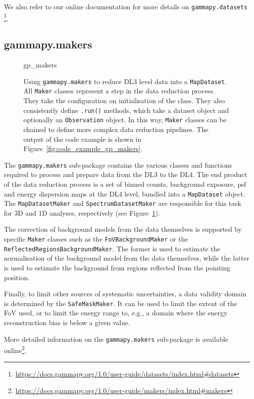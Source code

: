 \documentclass[longauth]{aa}
\newcommand{\code}[1]{\texttt{#1}}
\begin{document}
We also refer to our online documentation for more details on \code{gammapy.datasets}
\footnote{\url{https://docs.gammapy.org/1.0/user-guide/datasets/index.html\#datasets}}.

\subsection{gammapy.makers}
\label{ssec:gammapy-makers}
%
\begin{figure}
	\small
    {gp_makers}
	\caption{
        Using \code{gammapy.makers} to reduce DL3 level data into a
		\code{MapDataset}. All \code{Maker} classes represent 
		a step in the data reduction process. They take
        the configuration on initialisation of the class. They 
		also consistently define \code{.run()} methods, which take
		a dataset object and optionally an \code{Observation} 
		object. In this way, \code{Maker} classes can be chained
		to define more complex data reduction pipelines. The output
		of the code example is shown in Figure~\ref{fig:code_example_gp_makers}.
    }
	\label{fig*:minted:gp_makers}
\end{figure}
%
The \code{gammapy.makers} sub-package contains the various classes and functions required
to process and prepare \gammaray data from the DL3 to the DL4.
The end product of the data reduction process is a set of binned counts,
background exposure, psf and energy dispersion maps at the DL4 level, bundled
into a \code{MapDataset} object.
The \code{MapDatasetMaker} and \code{SpectrumDatasetMaker} are
responsible for this task for 3D and 1D analyses, respectively (see Figure~\ref{fig*:minted:gp_makers}).

The correction of background models from the data themselves is supported 
by specific \code{Maker} classes such as the \code{FoVBackgroundMaker} or the
\code{ReflectedRegionsBackgroundMaker}. The former is used to estimate the
normalisation of the background model from the data themselves, while the
latter is used to estimate the background from regions reflected from the
pointing position.

Finally, to limit other sources of systematic uncertainties, a data validity
domain is determined by the \code{SafeMaskMaker}. It can be used to limit the
extent of the FoV used, or to limit the energy range to, e.g., a domain
where the energy reconstruction bias is below a given value.

More detailed information on the \code{gammapy.makers} sub-package is available online\footnote{\url{https://docs.gammapy.org/1.0/user-guide/makers/index.html\#makers}}.
\end{document}
